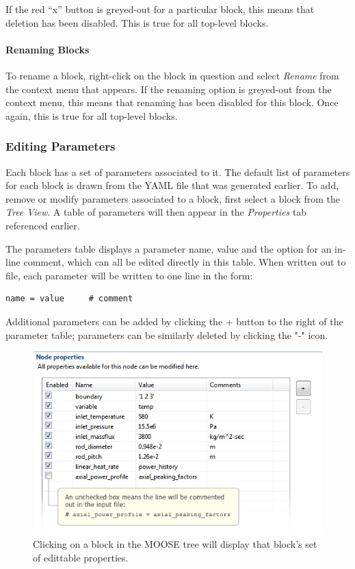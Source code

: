 If the red ``x'' button is greyed-out for a particular block, this means
that deletion has been disabled. This is true for all top-level blocks.

\paragraph{Renaming Blocks}\label{renaming-blocks}

To rename a block, right-click on the block in question and select
\emph{Rename} from the context menu that appears. If the renaming option
is greyed-out from the context menu, this means that renaming has been
disabled for this block. Once again, this is true for all top-level
blocks.

\subsubsection{Editing Parameters}\label{editing-parameters}

Each block has a set of parameters associated to it. The default list of
parameters for each block is drawn from the YAML file that was generated
earlier. To add, remove or modify parameters associated to a block,
first select a block from the \emph{Tree View}. A table of parameters
will then appear in the \emph{Properties} tab referenced earlier.

The parameters table displays a parameter name, value and the option for
an in-line comment, which can all be edited directly in this table. When
written out to file, each parameter will be written to one line in the
form:

\begin{verbatim}
name = value     # comment
\end{verbatim}

Additional parameters can be added by clicking the + button to the
right of the parameter table; parameters can be similarly deleted by
clicking the "-" icon.

\begin{figure}[htbp]
\centering
\includegraphics[width=\textwidth]{figures/ICE_MOOSEBlockParameters.png}
\caption{Clicking on a block in the MOOSE tree will display that block's set of edittable properties.}
\end{figure}

